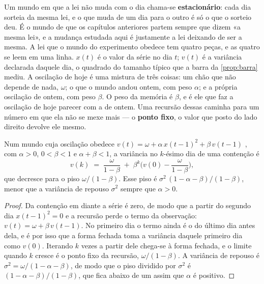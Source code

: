 Um mundo em que a lei não muda com o dia chama-se \textbf{estacionário}: cada dia sorteia da mesma
lei, e o que muda de um dia para o outro é só o que o sorteio deu. É o mundo de que os capítulos
anteriores partem sempre que dizem «a mesma lei», e a mudança estudada aqui é justamente a lei
deixando de ser a mesma.
A lei que o mundo do experimento obedece tem quatro peças, e as quatro se leem em uma linha.
$x(t)$ é o valor da série no dia $t$; $v(t)$ é a variância declarada daquele dia, o quadrado do
tamanho típico que a barra da \cref{prop:barra} mediu. A oscilação de hoje é uma mistura de três
coisas: um chão que não depende de nada, $\omega$; o que o mundo andou ontem, com peso $\alpha$;
e a própria oscilação de ontem, com peso $\beta$. O peso da memória é $\beta$, e é ele que faz a
oscilação de hoje parecer com a de ontem. Uma recursão dessas caminha para um número em que ela
não se mexe mais --- o \textbf{ponto fixo}, o valor que posto do lado direito devolve ele mesmo.

\begin{proposicao}\label{prop:piso-contencao}
Num mundo cuja oscilação obedece $v(t) = \omega + \alpha\, x(t-1)^2 + \beta\, v(t-1)$
\cite{bollerslev1986generalized}, com $\alpha > 0$, $0 < \beta < 1$ e $\alpha+\beta < 1$, a variância no $k$-ésimo dia de uma contenção é
\[
v(k) \;=\; \frac{\omega}{1-\beta} \;+\; \beta^{k}\Big( v(0) - \frac{\omega}{1-\beta} \Big),
\]
que decresce para o piso $\omega/(1-\beta)$. Esse piso é $\sigma^{2}\,(1-\alpha-\beta)/(1-\beta)$,
menor que a variância de repouso $\sigma^{2}$ sempre que $\alpha > 0$.
\end{proposicao}

\begin{proof}
Da contenção em diante a série é zero, de modo que a partir do segundo dia $x(t-1)^2 = 0$ e a
recursão perde o termo da observação: $v(t) = \omega + \beta\, v(t-1)$. No primeiro dia o termo
ainda é o do último dia antes dela, e é por isso que a forma fechada toma a variância daquele
primeiro dia como $v(0)$. Iterando $k$ vezes a partir dele chega-se à forma fechada, e o limite quando $k$ cresce é o ponto fixo da recursão, $\omega/(1-\beta)$. A
variância de repouso é $\sigma^{2} = \omega/(1-\alpha-\beta)$, de modo que o piso dividido por
$\sigma^{2}$ é $(1-\alpha-\beta)/(1-\beta)$, que fica abaixo de um assim que $\alpha$ é positivo.
\end{proof}

